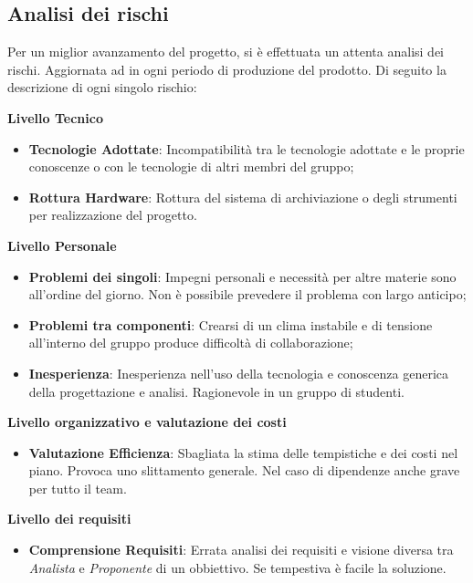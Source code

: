 \documentclass[12pt,a4paper,titlepage]{article}
\begin{document}
	\subsection{Analisi dei rischi}
		Per un miglior avanzamento del progetto, si è effettuata un attenta analisi dei rischi. Aggiornata ad in ogni periodo di produzione del prodotto.
		Di seguito la descrizione di ogni singolo rischio:\\
		\begin{center}
			\textbf{Livello Tecnico}
		\end{center}
		\begin{itemize}
			\item \textbf{Tecnologie Adottate}: Incompatibilità tra le tecnologie adottate e le proprie conoscenze o con le tecnologie di altri membri del gruppo;
			\item \textbf{Rottura Hardware}: Rottura del sistema di archiviazione o degli strumenti per realizzazione del progetto.
		\end{itemize}
		\begin{center}
			\textbf{Livello Personale}
		\end{center}
		\begin{itemize}
			\item \textbf{Problemi dei singoli}: Impegni personali e necessità per altre materie sono all'ordine del giorno. Non è possibile prevedere il problema con largo anticipo;
			\item \textbf{Problemi tra componenti}: Crearsi di un clima instabile e di tensione all'interno del gruppo produce difficoltà di collaborazione;
			\item \textbf{Inesperienza}: Inesperienza nell'uso della tecnologia e conoscenza generica della progettazione e analisi. Ragionevole in un gruppo di studenti.
		\end{itemize}
		\begin{center}
			\textbf{Livello organizzativo e valutazione dei costi}
		\end{center}
		\begin{itemize}
			\item \textbf{Valutazione Efficienza}: Sbagliata la stima delle tempistiche e dei costi nel piano. Provoca uno slittamento generale. Nel caso di dipendenze anche grave per tutto il team.
		\end{itemize}
		\begin{center}
			\textbf{Livello dei requisiti}
		\end{center}
		\begin{itemize}
			\item \textbf{Comprensione Requisiti}: Errata analisi dei requisiti e visione diversa tra \textit{Analista} e \textit{Proponente} di un obbiettivo. Se tempestiva è facile la soluzione.
		\end{itemize}
\end{document}
